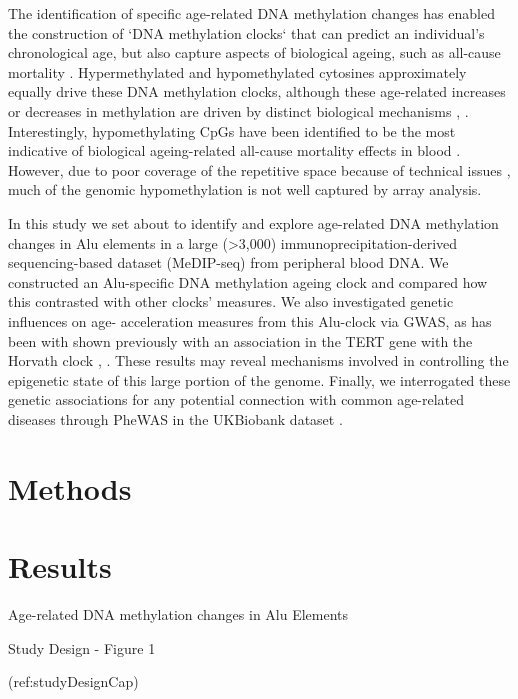 \documentclass[
]{book}
\begin{document}
The identification of specific age-related DNA methylation changes has enabled the construction of `DNA methylation clocks` \citep{Horvath2018} that can predict an individual's chronological age, but also capture aspects of biological ageing, such as all-cause mortality \citep{Marioni2015}.
Hypermethylated and hypomethylated cytosines approximately equally drive these DNA methylation clocks, although these age-related increases or decreases in methylation are driven by distinct biological mechanisms \citep{Mozhui2017}, \citep{Wu2017}.
Interestingly, hypomethylating CpGs have been identified to be the most indicative of biological ageing-related all-cause mortality effects in blood \citep{Zhang2017}.
However, due to poor coverage of the repetitive space because of technical issues \citep{Bell2019}, much of the genomic hypomethylation is not well captured by array analysis.

In this study we set about to identify and explore age-related DNA methylation changes in Alu elements in a large (\textgreater3,000) immunoprecipitation-derived sequencing-based dataset (MeDIP-seq) from peripheral blood DNA. We constructed an Alu-specific DNA methylation ageing clock and compared how this contrasted with other clocks' measures. We also investigated genetic influences on age- acceleration measures from this Alu-clock via GWAS, as has been with shown previously with an association in the TERT gene with the Horvath clock \citep{Lu2017}, \citep{Gibson2019}.
These results may reveal mechanisms involved in controlling the epigenetic state of this large portion of the genome.
Finally, we interrogated these genetic associations for any potential connection with common age-related diseases through PheWAS in the UKBiobank dataset \citep{Bycroft2017}.

\hypertarget{methods-2}{%
\chapter{Methods}\label{methods-2}}

\hypertarget{results-1}{%
\chapter{Results}\label{results-1}}

Age-related DNA methylation changes in Alu Elements

Study Design - Figure 1

(ref:studyDesignCap)
\end{document}
